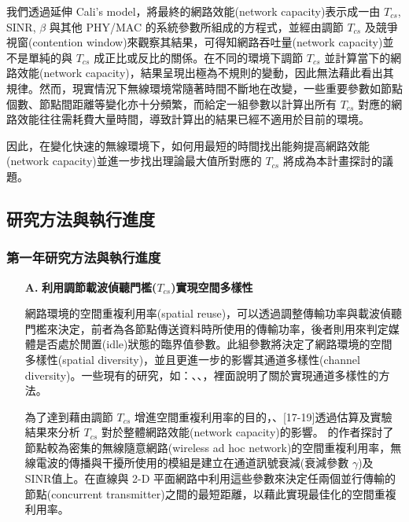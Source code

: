 \documentclass[12pt,a4paper]{article}
\begin{document}
\begin{description}
我們透過延伸 Cali’s  model\cite{tn00_cali}，將最終的網路效能(network capacity)表示成一由 $T_{cs}$, SINR, $\beta$ 與其他 PHY/MAC 的系統參數所組成的方程式，並經由調節 $T_{cs}$ 及競爭視窗(contention window)來觀察其結果，可得知網路吞吐量(network capacity)並不是單純的與 $T_{cs}$ 成正比或反比的關係。在不同的環境下調節 $T_{cs}$ 並計算當下的網路效能(network capacity)，結果呈現出極為不規則的變動，因此無法藉此看出其規律。然而，現實情況下無線環境常隨著時間不斷地在改變，一些重要參數如節點個數、節點間距離等變化亦十分頻繁，而給定一組參數以計算出所有 $T_{cs}$ 對應的網路效能往往需耗費大量時間，導致計算出的結果已經不適用於目前的環境。 

因此，在變化快速的無線環境下，如何用最短的時間找出能夠提高網路效能(network capacity)並進一步找出理論最大值所對應的 $T_{cs}$ 將成為本計畫探討的議題。\\

\subsection{研究方法與執行進度}
\subsubsection{第一年研究方法與執行進度}

\begin{enumerate}
\setlength\parindent{2em}    %
\item [\bf A.]{\textbf{\Kai 利用調節載波偵聽門檻($T_{cs}$)實現空間多樣性 }}\\
\vspace{-2mm}

網路環境的空間重複利用率(spatial reuse)，可以透過調整傳輸功率與載波偵聽門檻來決定，前者為各節點傳送資料時所使用的傳輸功率，後者則用來判定媒體是否處於閒置(idle)狀態的臨界值參數。此組參數將決定了網路環境的空間多樣性(spatial diversity)，並且更進一步的影響其通道多樣性(channel diversity)。一些現有的研究，如：\cite{ccr2004_rws}、\cite{mobicom04_ssch}、\cite{mobihoc04_mcmac}，裡面說明了關於實現通道多樣性的方法。

為了達到藉由調節 $T_{cs}$ 增進空間重複利用率的目的，\cite{vtc03_sr}、[17-19]透過估算及實驗結果來分析 $T_{cs}$ 對於整體網路效能(network capacity)的影響。 
\cite{vtc03_sr}的作者探討了節點較為密集的無線隨意網路(wireless ad hoc network)的空間重複利用率，無線電波的傳播與干擾所使用的模組是建立在通道訊號衰減(衰減參數 $\gamma$)及 SINR值上。在直線與 2-D 平面網路中利用這些參數來決定任兩個並行傳輸的節點(concurrent transmitter)之間的最短距離，以藉此實現最佳化的空間重複利用率。 


\end{enumerate}
\end{description}
\end{document}
